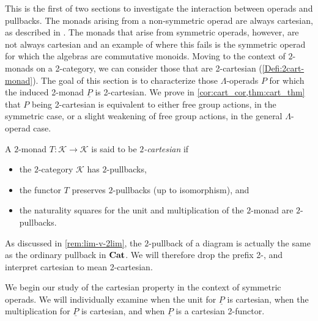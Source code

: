 This is the first of two sections to investigate the interaction between operads and pullbacks. The monads arising from a non-symmetric operad are always cartesian, as described in \cite[Appendix C]{leinster}. The monads that arise from symmetric operads, however, are not always cartesian and an example of where this fails is the symmetric operad for which the algebras are commutative monoids. 
Moving to the context of $2$-monads on a 2-category, we can consider those that are 2-cartesian (\cref{Defi:2cart-monad}).
The goal of this section is to characterize those $\Lambda$-operads $P$ for which the induced 2-monad $\underline{P}$ is 2-cartesian. 
We prove in \cref{cor:cart_cor,thm:cart_thm} that $P$ being 2-cartesian is equivalent to either free group actions, in the symmetric case, or a slight weakening of free group actions, in the general $\Lambda$-operad case.





\begin{Defi}\label{Defi:2cart-monad}
A $2$-monad $T \colon \mathcal{K} \rightarrow \mathcal{K}$ is said to be \textit{$2$-cartesian} if
    \begin{itemize}
        \item the $2$-category $\mathcal{K}$ has $2$-pullbacks,
        \item the functor $T$ preserves $2$-pullbacks (up to isomorphism), and
        \item the naturality squares for the unit and multiplication of the $2$-monad are $2$-pullbacks.
    \end{itemize}
\end{Defi}

\begin{rem}
As discussed in \cref{rem:lim-v-2lim}, the  $2$-pullback of a diagram is actually the same as the ordinary pullback in $\mathbf{Cat}$. We will therefore drop the prefix 2-, and interpret cartesian to mean 2-cartesian.
\end{rem}

We begin our study of the cartesian property in the context of symmetric operads.
We will individually examine when the unit for $\underline{P}$ is cartesian, when the multiplication for $\underline{P}$ is cartesian, and when $\underline{P}$ is a cartesian 2-functor.

